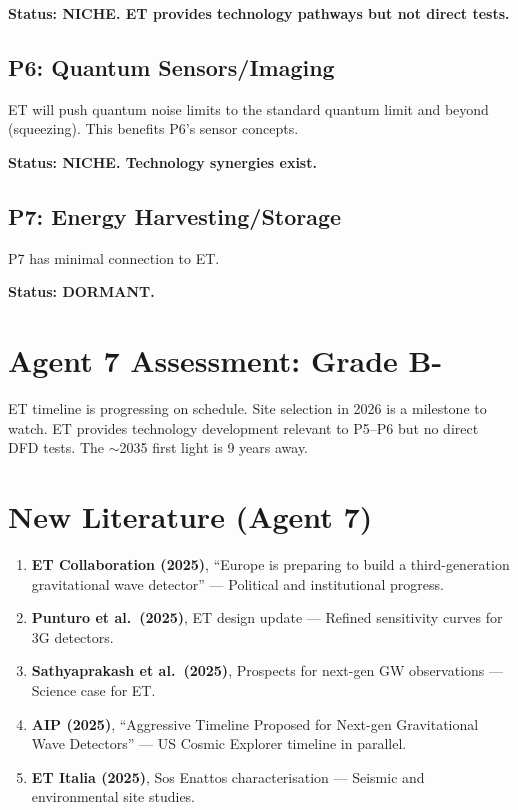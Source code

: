 \documentclass[11pt,a4paper]{article}
\begin{document}
\textbf{Status: NICHE. ET provides technology pathways but not direct tests.}

\subsection{P6: Quantum Sensors/Imaging}

ET will push quantum noise limits to the standard quantum limit and beyond (squeezing). This benefits P6's sensor concepts.

\textbf{Status: NICHE. Technology synergies exist.}

\subsection{P7: Energy Harvesting/Storage}

P7 has minimal connection to ET.

\textbf{Status: DORMANT.}

\section{Agent 7 Assessment: Grade B-}

ET timeline is progressing on schedule. Site selection in 2026 is a milestone to watch. ET provides technology development relevant to P5--P6 but no direct DFD tests. The $\sim$2035 first light is 9 years away.

\section{New Literature (Agent 7)}

\begin{enumerate}
\item \textbf{ET Collaboration (2025)}, ``Europe is preparing to build a third-generation gravitational wave detector'' --- Political and institutional progress.
\item \textbf{Punturo et al.\ (2025)}, ET design update --- Refined sensitivity curves for 3G detectors.
\item \textbf{Sathyaprakash et al.\ (2025)}, Prospects for next-gen GW observations --- Science case for ET.
\item \textbf{AIP (2025)}, ``Aggressive Timeline Proposed for Next-gen Gravitational Wave Detectors'' --- US Cosmic Explorer timeline in parallel.
\item \textbf{ET Italia (2025)}, Sos Enattos characterisation --- Seismic and environmental site studies.
\end{enumerate}
\end{document}
